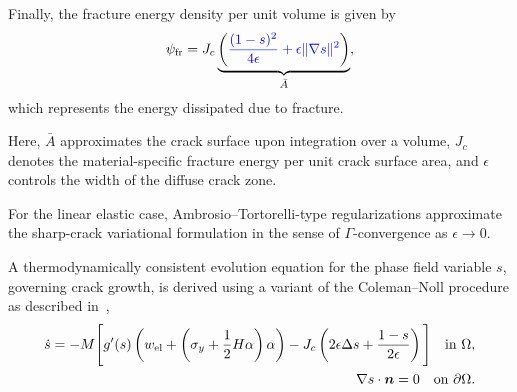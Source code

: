 \documentclass[pdflatex,sn-mathphys-num]{sn-jnl}%
\newcommand{\changed}[1]{\begingroup\color{blue}#1\endgroup}
\theoremstyle{thmstyleone}%
\theoremstyle{thmstyletwo}%
\theoremstyle{thmstylethree}%
\begin{document}
Finally, the fracture energy density per unit volume is given by
\begin{equation}
    \psi_{\rm{fr}} = J_c
    \underbrace{\left(
    \changed{\dfrac{(1-s)^2}{4\epsilon} + \epsilon\|\nabla{s}\|^2}
    \right)}_{\bar{A}},
    \label{eq:psi_fr}
\end{equation}
which represents the energy dissipated due to fracture. 

Here, $\bar{A}$ approximates the crack surface upon integration over a volume, $J_c$ denotes the material-specific fracture energy per unit crack surface area, and $\epsilon$ controls the width of the diffuse crack zone.


For the linear elastic case, Ambrosio--Tortorelli-type regularizations approximate the sharp-crack variational formulation in the sense of $\Gamma$-convergence as $\epsilon \to 0$. 

A thermodynamically consistent evolution equation for the phase field variable $s$, governing crack growth, is derived using a variant of the Coleman--Noll procedure as described in~\cite{noll_3d_2020},
\begin{align}
    \begin{split}
    \dot{s} = -M \Bigg[
    g'(s)\left(w_{\rm{el}} + \left(\sigma_y+\dfrac{1}{2}H\alpha\right)\alpha\right)
    - J_c\left(2\epsilon\Delta{s} + \dfrac{1-s}{2\epsilon}\right)
    \Bigg]
    \quad \text{in} \ \Omega, \\
    \nabla{s}\cdot{\boldsymbol{n}} = 0 \quad \text{on} \ \partial\Omega.
    \label{eq:evolution_s}
    \end{split}
\end{align}
\end{document}
